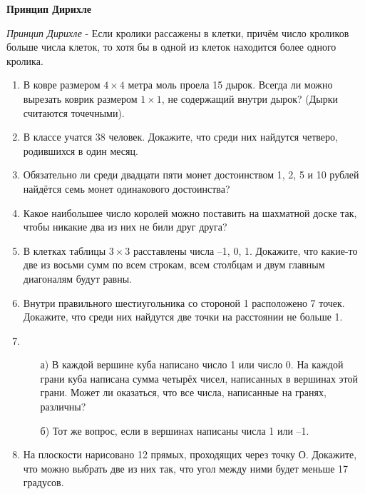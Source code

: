 \documentclass{article}
\begin{document}
\large
	
	
	\begin{center}
		\textbf{Принцип Дирихле}
	\end{center}
	
	
	\textit{Принцип Дирихле} - Если кролики рассажены в клетки, причём число кроликов больше числа клеток, то хотя бы в одной из клеток находится более одного кролика.
	
	\begin{enumerate}[label*=\protect\fbox{\arabic{enumi}}]
		
		\item В ковре размером $4 \times 4$ метра моль проела 15 дырок. Всегда ли можно вырезать коврик размером $1 \times 1$, не содержащий внутри дырок? (Дырки считаются точечными).
		
		\item В классе учатся 38 человек. Докажите, что среди них найдутся четверо, родившихся в один месяц.
		
		\item Обязательно ли среди двадцати пяти монет достоинством 1, 2, 5 и 10 рублей найдётся семь монет одинакового достоинства?
		
		\item Какое наибольшее число королей можно поставить на шахматной доске так, чтобы никакие два из них не били друг друга?
		
		\item В клетках таблицы $3 \times 3$ расставлены числа –1, 0, 1. Докажите, что какие-то две из восьми сумм по всем строкам, всем столбцам и двум главным диагоналям будут равны.
		
		\item Внутри правильного шестиугольника со стороной 1 расположено 7 точек. Докажите, что среди них найдутся две точки на расстоянии не больше 1.
		
		\item \begin{enumerate} 
			\item[а)] В каждой вершине куба написано число 1 или число 0. На каждой грани куба написана сумма четырёх чисел, написанных в вершинах этой грани. Может ли оказаться, что все числа, написанные на гранях, различны? 
			\item[б)] Тот же вопрос, если в вершинах написаны числа 1 или –1.
		\end{enumerate}
		
		\item На плоскости нарисовано 12 прямых, проходящих через точку О. Докажите, что можно выбрать две из них так, что угол между ними будет меньше 17 градусов.
		

\end{enumerate}
\end{document}
